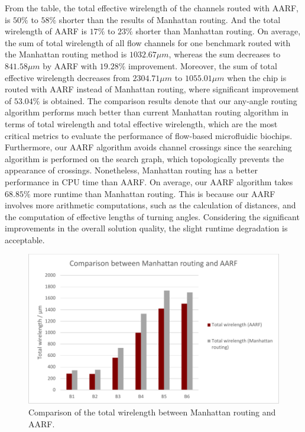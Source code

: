 \documentclass[journal]{IEEEtran}
\begin{document}
From the table, the total effective wirelength of the channels routed with AARF, is $50\%$ to $58\%$ shorter than the results of Manhattan routing. 
And the total wirelength of AARF is $17\%$ to $23\%$ shorter than Manhattan routing. On average, the sum of total wirelength of all flow channels for one benchmark routed with the Manhattan routing method is $1032.67 {\mu}m$, whereas the sum decreases to $841.58 {\mu}m$ by AARF with $19.28\%$ improvement.
Moreover, the sum of total effective wirelength decreases from $2304.71 {\mu}m$ to $1055.01 {\mu}m$ when the chip is routed with AARF instead of Manhattan routing, where significant improvement of $53.04\%$ is obtained.
The comparison results denote that our any-angle routing algorithm performs much better than current Manhattan routing algorithm in terms of total wirelength and total effective wirelength, which are the most critical metrics to evaluate the performance of flow-based microfluidic biochips. 
Furthermore, our AARF algorithm avoids channel crossings since the searching algorithm is performed on the search graph, which topologically prevents the appearance of crossings. 
Nonetheless, Manhattan routing has a better performance in CPU time than AARF. On average, our AARF algorithm takes $68.85\%$ more runtime than Manhattan routing. This is because our AARF involves more arithmetic computations, such as the calculation of distances, and the computation of effective lengths of turning angles. 
Considering the significant improvements in the overall solution quality, the slight runtime degradation is acceptable. 

\begin{figure}
	\label{fig:mvaa}
	\centering
	\includegraphics[width=0.95\columnwidth, angle=0]{./Figs/MR_vs_AARF_A.pdf}
	\vspace{-0.2cm}
	\caption{Comparison of the total wirelength between Manhattan routing and AARF.}
	\label{fig:mvaa}
\end{figure}
\end{document}
